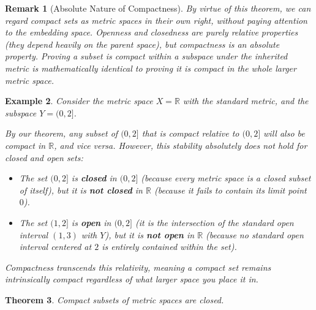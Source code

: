 \documentclass{article}
\theoremstyle{mythm}
\newtheorem{theorem}{Theorem}[section]
\newtheorem{remark}[theorem]{Remark}
\newtheorem{example}[theorem]{Example}
\begin{document}
\begin{remark}[Absolute Nature of Compactness]
By virtue of this theorem, we can regard compact sets as metric spaces in their own right, without paying attention to the embedding space. Openness and closedness are purely relative properties (they depend heavily on the parent space), but compactness is an absolute property. Proving a subset is compact within a subspace under the inherited metric is mathematically identical to proving it is compact in the whole larger metric space.
\end{remark}

\begin{example}
Consider the metric space $X = \mathbb{R}$ with the standard metric, and the subspace $Y = (0, 2]$.

By our theorem, any subset of $(0, 2]$ that is compact relative to $(0, 2]$ will also be compact in $\mathbb{R}$, and vice versa. However, this stability absolutely does not hold for closed and open sets:
\begin{itemize}
    \item The set $(0, 2]$ is \textbf{closed} in $(0, 2]$ (because every metric space is a closed subset of itself), but it is \textbf{not closed} in $\mathbb{R}$ (because it fails to contain its limit point $0$).
    \item The set $(1, 2]$ is \textbf{open} in $(0, 2]$ (it is the intersection of the standard open interval $(1, 3)$ with $Y$), but it is \textbf{not open} in $\mathbb{R}$ (because no standard open interval centered at $2$ is entirely contained within the set).
\end{itemize}
Compactness transcends this relativity, meaning a compact set remains intrinsically compact regardless of what larger space you place it in.
\end{example}
\begin{theorem}
Compact subsets of metric spaces are closed.
\end{theorem}
\end{document}
